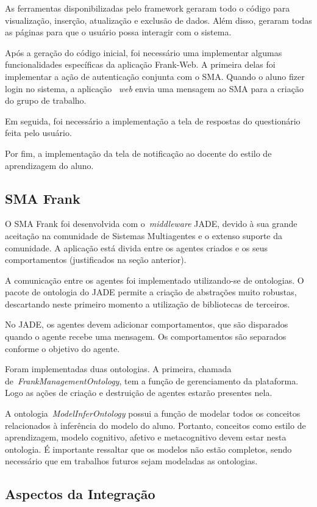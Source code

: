 As ferramentas disponibilizadas pelo framework geraram todo o código para visualização, inserção, atualização e exclusão de dados. Além disso, geraram todas as páginas para que o usuário possa interagir com o sistema. 

Após a geração do código inicial, foi necessário uma implementar algumas funcionalidades específicas da aplicação Frank-Web. A primeira delas foi implementar a ação de autenticação conjunta com o SMA. Quando o aluno fizer login no sistema, a aplicação ~\emph{web} envia uma mensagem ao SMA para a criação do grupo de trabalho.

Em seguida, foi necessário a implementação a tela de respostas do questionário feita pelo usuário.

Por fim, a implementação da tela de notificação ao docente do estilo de aprendizagem do aluno.

\subsection{SMA Frank}

O SMA Frank foi desenvolvida com o~\emph{middleware} JADE, devido à sua grande aceitação na comunidade de Sistemas Multiagentes e o extenso suporte da comunidade. A aplicação está divida entre os agentes criados e os seus comportamentos (justificados na seção anterior).

A comunicação entre os agentes foi implementado utilizando-se de ontologias. O pacote de ontologia do JADE permite a criação de abstrações muito robustas, descartando neste primeiro momento a utilização de bibliotecas de terceiros.

No JADE, os agentes devem adicionar comportamentos, que são disparados quando o agente recebe uma mensagem. Os comportamentos são separados conforme o objetivo do agente.

Foram implementadas duas ontologias. A primeira, chamada de~\emph{FrankManagementOntology}, tem a função de gerenciamento da plataforma. Logo as ações de criação e destruição de agentes estarão presentes nela.

A ontologia~\emph{ModelInferOntology} possui a função de modelar todos os conceitos relacionados à inferência do modelo do aluno. Portanto, conceitos como estilo de aprendizagem, modelo cognitivo, afetivo e metacognitivo devem estar nesta ontologia. É importante ressaltar que os modelos não estão completos, sendo necessário que em trabalhos futuros sejam modeladas as ontologias.

\subsection{Aspectos da Integração}

